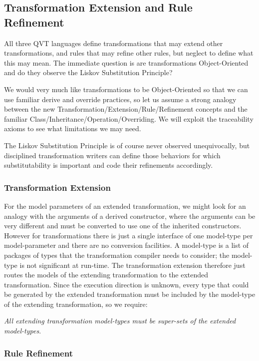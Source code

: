 \documentclass[runningheads,a4paper]{llncs}
\begin{document}
\subsection{Transformation Extension and Rule Refinement}

All three QVT languages define transformations that may extend other transformations, and rules that may refine other rules, but neglect to define what this may mean. The immediate question is are transformations Object-Oriented and do they observe the Liskov Substitution Principle\cite{liskovSubstitutionPrinciple}? 

We would very much like transformations to be Object-Oriented so that we can use familiar derive and override practices, so let us assume a strong analogy between the new Transformation/Extension/Rule/Refinement concepts and the familiar Class/Inheritance/Operation/Overriding. We will exploit the traceability axioms to see what limitations we may need.

The Liskov Substitution Principle is of course never observed unequivocally, but disciplined transformation writers can define those behaviors for which substitutability is important and code their refinements accordingly.

\subsubsection{Transformation Extension}

For the model parameters of an extended transformation, we might look for an analogy with the arguments of a derived constructor, where the arguments can be very different and must be converted to use one of the inherited constructors. However for transformations there is just a single interface of one model-type per model-parameter and there are no conversion facilities. A model-type is a list of packages of types that the transformation compiler needs to consider; the model-type is not significant at run-time. The transformation extension therefore just routes the models of the extending transformation to the extended transformation. Since the execution direction is unknown, every type that could be generated by the extended transformation must be included by the model-type of the extending transformation, so we require:

\emph{All extending transformation model-types must be super-sets of the extended model-types}. 

\subsubsection{Rule Refinement}
\end{document}
